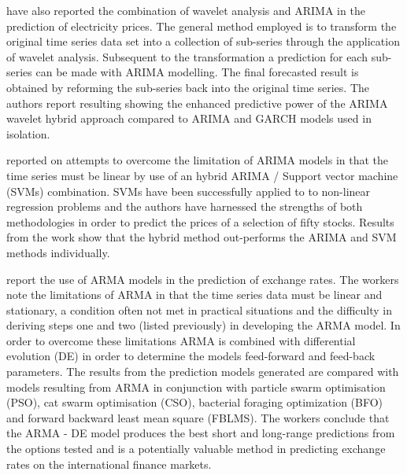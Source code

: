 \cite{Tan20103606} have also reported the combination of wavelet analysis and ARIMA in the prediction of electricity prices. The general method employed is to transform the original time series data set into a collection of sub-series through the application of wavelet analysis. Subsequent to the transformation a prediction for each sub-series can be made with ARIMA modelling. The final forecasted result is obtained by reforming the sub-series back into the original time series. The authors report resulting showing the enhanced predictive power of the ARIMA wavelet hybrid approach compared to ARIMA and GARCH models used in isolation.

\cite{Pai2005497} reported on attempts to overcome the limitation of ARIMA models in that the time series must be linear by use of an hybrid ARIMA / Support vector machine (SVMs) combination. SVMs have been successfully applied to to non-linear regression problems and the authors have harnessed the strengths of both methodologies in order to predict the prices of a selection of fifty stocks. Results from the work show that the hybrid method out-performs the ARIMA and SVM methods individually.

\cite{Rout20147} report the use of ARMA models in the prediction of exchange rates. The workers note the limitations of ARMA in that the time series data must be linear and stationary, a condition often not met in practical situations and the difficulty in deriving steps one and two (listed previously) in developing the ARMA model. In order to overcome these limitations ARMA is combined with differential evolution (DE) in order to determine the models feed-forward and feed-back parameters. The results from the prediction models generated are compared with models resulting from ARMA in conjunction with particle swarm optimisation (PSO), cat swarm optimisation (CSO), bacterial foraging optimization (BFO) and forward backward least mean square (FBLMS). The workers conclude that the ARMA - DE model produces the best short and long-range predictions from the options tested and is a potentially valuable method in predicting exchange rates on the international finance markets.


 
